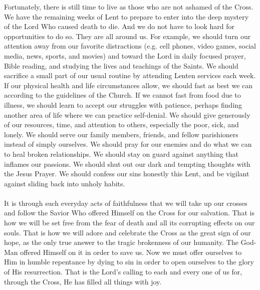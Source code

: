\documentclass[twoside, letterpaper, 12pt]{report}
\begin{document}
\begin{maybetwocolumns}
Fortunately, there is still time to live as those who are not ashamed of the Cross. We have the
remaining weeks of Lent to prepare to enter into the deep mystery of the Lord Who caused death
to die. And we do not have to look hard for opportunities to do so. They are all around us. For
example, we should turn our attention away from our favorite distractions (e.g. cell phones, video
games, social media, news, sports, and movies) and toward the Lord in daily focused prayer, Bible
reading, and studying the lives and teachings of the Saints. We should sacrifice a small part of our
usual routine by attending Lenten services each week. If our physical health and life circumstances
allow, we should fast as best we can according to the guidelines of the Church. If we cannot fast
from food due to illness, we should learn to accept our struggles with patience, perhaps finding
another area of life where we can practice self-denial. We should give generously of our resources,
time, and attention to others, especially the poor, sick, and lonely. We should serve our family
members, friends, and fellow parishioners instead of simply ourselves. We should pray for our
enemies and do what we can to heal broken relationships. We should stay on guard against
anything that inflames our passions. We should shut out our dark and tempting thoughts with the
Jesus Prayer. We should confess our sins honestly this Lent, and be vigilant against sliding back
into unholy habits.\\\mbox{}\\

It is through such everyday acts of faithfulness that we will take up our crosses and follow the
Savior Who offered Himself on the Cross for our salvation. That is how we will be set free from
the fear of death and all its corrupting effects on our souls. That is how we will adore and celebrate
the Cross as the great sign of our hope, as the only true answer to the tragic brokenness of our
humanity. The God-Man offered Himself on it in order to save us. Now we must offer ourselves
to Him in humble repentance by dying to sin in order to open ourselves to the glory of His
resurrection. That is the Lord’s calling to each and every one of us for, through the Cross, He has
filled all things with joy.

\end{maybetwocolumns}



\readerline{\throughtheprayers}

\end{document}
